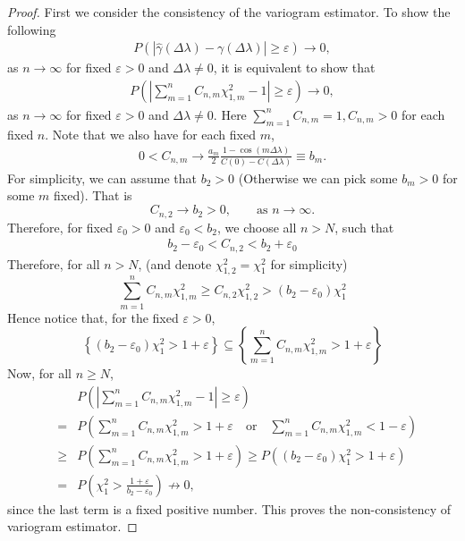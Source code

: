 \begin{proof}
First we consider the consistency of the variogram estimator. To show the following
\begin{eqnarray*}
P\left( \left|\hat{\gamma}(\Delta \lambda) - \gamma(\Delta \lambda)\right| \ge \varepsilon\right) \to 0,
\end{eqnarray*}
as $n \to \infty$ for fixed $\varepsilon > 0$ and $\Delta \lambda \ne 0$, it is equivalent to show that
\begin{eqnarray*}
P\left( \left|\sum_{m = 1}^n C_{n, m} \chi_{1, m}^2 - 1 \right| \ge \varepsilon\right) \to 0,
\end{eqnarray*}
as $n \to \infty$ for fixed $\varepsilon > 0$ and $\Delta \lambda \ne 0$. Here $\sum_{m=1}^n C_{n, m} = 1, C_{n, m} > 0$ for each fixed $n$. Note that we also have for each fixed $m$,
\begin{eqnarray*}
0 < C_{n, m} \to \frac{a_m}{2}\frac{1 - \cos(m \Delta \lambda)}{C(0) - C(\Delta \lambda)} \equiv b_m.
\end{eqnarray*}
For simplicity, we can assume that $b_2 > 0$ (Otherwise we can pick some $b_m > 0$ for some $m$ fixed). That is
\[
C_{n, 2} \to b_2 > 0, \quad \quad \mbox{as $n \to \infty$}.
\]
Therefore, for fixed $\varepsilon_0 > 0$ and $\varepsilon_0 < b_2$, we choose all $n > N$, such that
\begin{eqnarray*}
b_2 - \varepsilon_0 < C_{n, 2} < b_2 + \varepsilon_0
\end{eqnarray*}
Therefore, for all $n > N$, (and denote $\chi_{1, 2}^2 = \chi_1^2$ for simplicity)
\[
\sum_{m = 1}^n C_{n, m}\chi_{1,m}^2  \ge  C_{n, 2} \chi_{1, 2}^2 > (b_2 - \varepsilon_0) \chi_1^2
\]
Hence notice that, for the fixed $\varepsilon > 0$,
\[
\left\{(b_2 - \varepsilon_0) \chi_{1}^2 > 1 + \varepsilon  \right\} \subseteq \left\{\sum_{m = 1}^n C_{n, m}\chi_{1,m}^2 > 1 + \varepsilon  \right\}
\]
Now, for all $n \ge N$,
\begin{eqnarray*}
& & P\left( \left|\sum_{m = 1}^n C_{n, m} \chi_{1, m}^2 - 1 \right| \ge \varepsilon\right) \\
&=& P\left( \sum_{m = 1}^n C_{n, m} \chi_{1, m}^2 > 1 + \varepsilon \quad \mbox{or} \quad  \sum_{m = 1}^n C_{n, m} \chi_{1, m}^2 < 1 - \varepsilon\right) \\
& \ge & P\left( \sum_{m = 1}^n C_{n, m} \chi_{1, m}^2 > 1 + \varepsilon \right)  \ge  P\left((b_2 - \varepsilon_0) \chi_{1}^2 > 1 + \varepsilon  \right) \\
& = & P\left(\chi_{1}^2 > \frac{1 + \varepsilon}{b_2 - \varepsilon_0}\right) \not\to 0,
\end{eqnarray*}
since the last term is a fixed positive number. This proves the non-consistency of variogram estimator.

\end{proof}



% 



